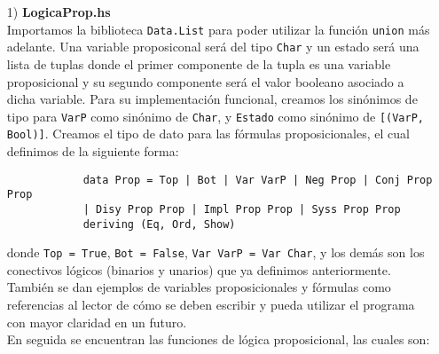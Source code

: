 \documentclass[letterpaper,12pt]{article}
\begin{document}
    \begin{itemize}
        \item[1)] \textbf{LogicaProp.hs} \\
        Importamos la biblioteca \texttt{Data.List} para poder utilizar 
        la función \texttt{union} más adelante. Una variable proposiconal 
        será del tipo \texttt{Char} y un estado será una lista de tuplas donde 
        el primer componente de la tupla es una variable proposicional y su 
        segundo componente será el valor booleano asociado a dicha variable.
        Para su implementación funcional, creamos los sinónimos de tipo para 
        \texttt{VarP} como sinónimo de \texttt{Char}, y \texttt{Estado} como 
        sinónimo de \texttt{[(VarP, Bool)]}. Creamos el tipo de dato para las 
        fórmulas proposicionales, el cual definimos de la siguiente forma:

        \begin{lstlisting}
            data Prop = Top | Bot | Var VarP | Neg Prop | Conj Prop Prop 
            | Disy Prop Prop | Impl Prop Prop | Syss Prop Prop 
            deriving (Eq, Ord, Show)
        \end{lstlisting}

        donde \texttt{Top = True}, \texttt{Bot = False}, 
        \texttt{Var VarP = Var Char}, y los demás son los conectivos lógicos
        (binarios y unarios) que ya definimos anteriormente. \\
        También se dan ejemplos de variables proposicionales y fórmulas 
        como referencias al lector de cómo se deben escribir y pueda utilizar 
        el programa con mayor claridad en un futuro. \\ 
        En seguida se encuentran las funciones de lógica proposicional, las
        cuales son:


\end{itemize}
\end{document}
